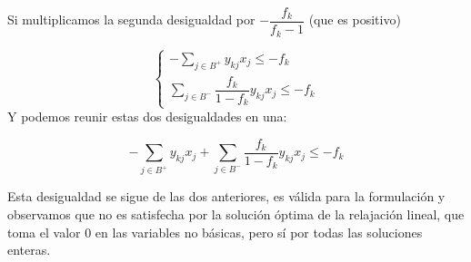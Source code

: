 \documentclass[openany]{book}
\begin{document}
Si multiplicamos la segunda desigualdad por $ -\dfrac{f_{k}}{f_{k}-1} $ (que es positivo)

$$ 
\left\{
\begin{array}{l}
  - \sum\limits_{j \in B^{+}}y_{kj}x_j \leq -f_{k}\\
  \sum\limits_{j \in B ^{-}}^{} \dfrac{f_{k}}{1-f_{k}}y_{kj}x_j \leq -f_{k}
\end{array}
\right.
$$
Y podemos reunir estas dos desigualdades en una:

$$ - \sum\limits_{j \in B^{+}}^{} y_{kj}x_j + \sum\limits_{j \in B^{-}}^{} \dfrac{f_{k}}{1-f_{k}} y_{kj}x_j \leq -f_{k} $$

Esta desigualdad se sigue de las dos anteriores, es válida para la formulación y observamos que no es satisfecha por la solución óptima de la relajación lineal, que toma el valor 0 en las variables no básicas, pero sí por todas las soluciones enteras.











\end{document}
